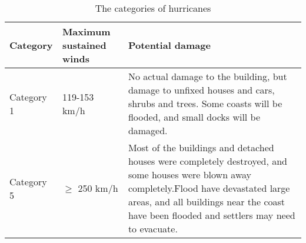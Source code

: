 \documentclass{mcmthesis}	%
\begin{document}
\begin{table}[!ht]%
\caption{The categories of hurricanes}%
 \renewcommand\arraystretch{1.5}
 \setlength{\abovecaptionskip}{0pt}%
\setlength{\belowcaptionskip}{10pt}%
\begin{center}%
\begin{tabular}{p{}p{}m{}}%
\toprule[1.5pt]%
Category& Maximum sustained winds & Potential damage \\
 \midrule%

  Category 1 & 119-153 km/h &   No actual damage to the building, but damage to unfixed houses and cars, shrubs and trees. Some coasts will be flooded, and small docks will be damaged. \\

%
%
%
  Category 5 & $ \geq $ 250 km/h &   Most of the buildings and detached houses were completely destroyed, and some houses were blown away completely.Flood have devastated large areas, and all buildings near the coast have been flooded and settlers may need to evacuate. \\  \bottomrule[1.5pt]%
 \end{tabular}
 \end{center} 
 \end{table}



%
\end{document}
